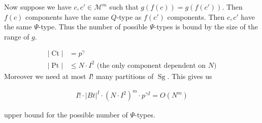 \documentclass{amsart}
\newcommand{\M}{\mathcal M}
\DeclareMathOperator{\Sg}{Sg}
\DeclareMathOperator{\Pt}{Pt}
\DeclareMathOperator{\Ct}{Ct}
\begin{document}
Now suppose we have $c, c' \in \M^m$ such that $g(f(c)) = g(f(c'))$.
Then $f(c)$ components have the same $Q$-type as $f(c')$ components.
Then $c, c'$ have the same $\Psi$-type.
Thus the number of possible $\Psi$-types is bound by the size of the range of $g$.

\begin{align*}
	|\Ct| &= p^\gamma \\
	|\Pt| &\leq N \cdot I^2 \text { (the only component dependent on $N$)}
\end{align*}
Moreover we need at most $I!$ many partitions of $\Sg$. This gives us

\begin{align*}
	I! \cdot |Bt|^I \cdot (N \cdot I^2)^m \cdot p^{\gamma I} = O(N^m)
\end{align*}

upper bound for the possible number of $\Psi$-types.
\end{document}
